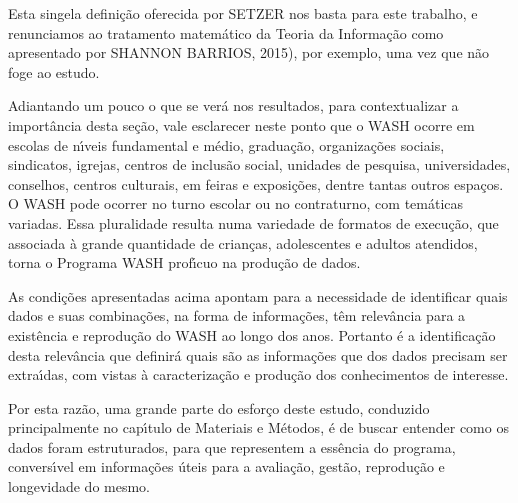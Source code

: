 \documentclass[
12pt,		%
openright,	%
twoside,  %
a4paper,			%
chapter=TITLE,		%
english,			%
french,				%
spanish,			%
brazil				%
]{USPSC-classe/USPSC}
\begin{document}
Esta singela defini\c{c}\~ao oferecida por SETZER nos basta para este trabalho, e renunciamos ao tratamento matem\'atico da Teoria da Informa\c{c}\~ao como apresentado por SHANNON BARRIOS, 2015), por exemplo, uma vez que n\~ao foge ao estudo.









Adiantando um pouco o que se ver\'a nos resultados, para contextualizar a import\^ancia desta se\c{c}\~ao, vale esclarecer neste ponto que o WASH ocorre  em escolas de n\'{\i}veis fundamental e m\'edio, gradua\c{c}\~ao, organiza\c{c}\~oes sociais, sindicatos, igrejas, centros de inclus\~ao social, unidades de pesquisa, universidades,  conselhos, centros culturais, em feiras e exposi\c{c}\~oes, dentre tantas outros espa\c{c}os. O WASH pode ocorrer no turno escolar ou no contraturno, com tem\'aticas variadas.  Essa pluralidade resulta numa variedade de formatos de execu\c{c}\~ao, que associada \`a grande quantidade de crian\c{c}as, adolescentes e adultos atendidos, torna o Programa WASH prof\'{\i}cuo na produ\c{c}\~ao de dados.









As condi\c{c}\~oes apresentadas acima apontam para a necessidade de identificar quais dados e suas combina\c{c}\~oes, na forma de informa\c{c}\~oes, t\^em relev\^ancia para a exist\^encia e reprodu\c{c}\~ao do WASH ao longo dos anos. Portanto \'e a identifica\c{c}\~ao desta relev\^ancia que definir\'a quais s\~ao as informa\c{c}\~oes que dos dados precisam ser extra\'{\i}das, com vistas \`a  caracteriza\c{c}\~ao e produ\c{c}\~ao dos conhecimentos de interesse.









Por esta raz\~ao, uma grande parte do esfor\c{c}o deste estudo, conduzido principalmente no cap\'{\i}tulo de Materiais e M\'etodos, \'e de buscar entender como os dados foram estruturados, para que representem a ess\^encia do programa, convers\'{\i}vel em informa\c{c}\~oes \'uteis para a avalia\c{c}\~ao, gest\~ao, reprodu\c{c}\~ao e longevidade do mesmo.
\end{document}
